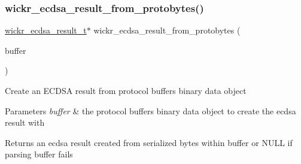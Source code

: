 \subsubsection{\texorpdfstring{wickr\+\_\+ecdsa\+\_\+result\+\_\+from\+\_\+protobytes()}{wickr\_ecdsa\_result\_from\_protobytes()}}
{\footnotesize\ttfamily \hyperlink{structwickr__ecdsa__result}{wickr\+\_\+ecdsa\+\_\+result\+\_\+t}$\ast$ wickr\+\_\+ecdsa\+\_\+result\+\_\+from\+\_\+protobytes (\begin{DoxyParamCaption}\item[{Protobuf\+C\+Binary\+Data}]{buffer }\end{DoxyParamCaption})}

Create an E\+C\+D\+SA result from protocol buffers binary data object


\begin{DoxyParams}{Parameters}
{\em buffer} & the protocol buffers binary data object to create the ecdsa result with \\
\hline
\end{DoxyParams}
\begin{DoxyReturn}{Returns}
an ecdsa result created from serialized bytes within \textquotesingle{}buffer\textquotesingle{} or N\+U\+LL if parsing buffer fails 
\end{DoxyReturn}
